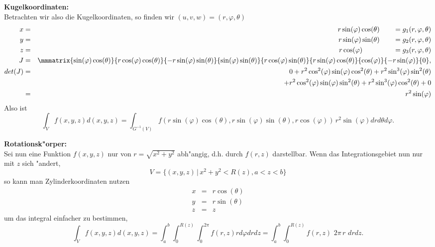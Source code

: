 \begin{bspX}  {\bf Kugelkoordinaten:}\\
Betrachten wir also die Kugelkoordinaten, so finden wir $(u,v,w) = (r,\varphi, \theta)$
\begin{eqnarray*}
 x & = & r\sin(\varphi)\cos(\theta) \qquad = g_1(r,\varphi,\theta)\\ 
 y & = & r\sin(\varphi)\sin(\theta) \qquad = g_2(r,\varphi,\theta)\\ 
 z & = & r \cos(\varphi) \qquad\qquad\,\,\, = g_3(r,\varphi,\theta)\\
 J &= & \mmmatrix{\sin(\varphi)\cos(\theta) }{r\cos(\varphi)\cos(\theta) }{-r\sin(\varphi)\sin(\theta) }  
                    {\sin(\varphi)\sin(\theta)}{r\cos(\varphi)\sin(\theta)}{r\sin(\varphi)\cos(\theta)}  
                     { \cos(\varphi) }{-r \sin(\varphi) }{0},\\
     det(J) & = & 0 + r^2\cos^2(\varphi)\sin(\varphi)\cos^2(\theta) + r^2 \sin^3(\varphi)\sin^2(\theta)\\
&&     +r^2\cos^2(\varphi)\sin(\varphi)\sin^2(\theta) + r^2 \sin^3(\varphi)\cos^2(\theta) + 0\\
&=&     r^2\sin(\varphi)
\end{eqnarray*}
Also ist
$$\int_V f(x,y,z) d(x,y,z) = \int_{G^{-1}(V)} f(r\sin(\varphi)\cos(\theta),  r\sin(\varphi)\sin(\theta), r \cos(\varphi) )\,  r^2\sin(\varphi) dr d\theta d\varphi.$$
\end{bspX}
\begin{bspX} {\bf Rotationsk"orper:}\\\label{volIntegralBsp}
Sei nun eine Funktion $f(x,y,z)$ nur von $r = \sqrt{x^2+y^2}$ abh"angig, d.h. 
durch  $f(r, z)$ darstellbar. Wenn das Integrationsgebiet
nun nur mit $z$ sich "andert,
$$ V = \{(x,y,z)\, |\, x^2+y^2 < R(z), a<z<b\}$$
so kann man Zylinderkoordinaten nutzen
 \begin{eqnarray*}
 x & = & r\cos(\theta)\\ 
 y & = & r\sin(\theta)\\ 
 z & = & z
 \end{eqnarray*}
um das integral einfacher zu bestimmen,
$$ \int_Vf(x,y,z) d(x,y,z) 
= \int_a ^b \int_0^{R(z)}\int_0^{2\pi} f(r,z) rd\varphi dr dz
= \int_a ^b \int_0^{R(z)} f(r,z)\,\, 2\pi \, r \,\,dr dz
.$$
\end{bspX}
\begin{auf}\chb\label{block8A2}

\end{auf}

